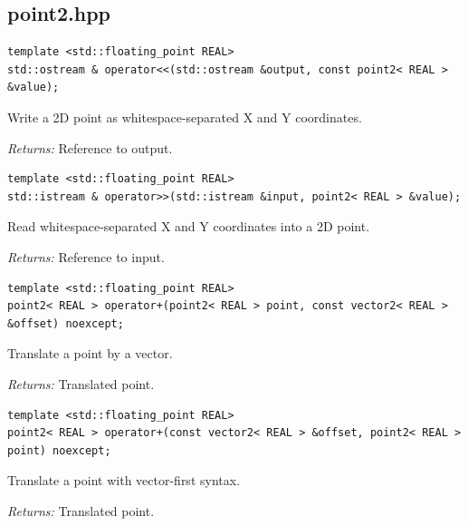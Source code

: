 \subsection{point2.hpp}
\par\noindent\begin{minipage}{\linewidth}
\begin{lstlisting}[style=apireference]
template <std::floating_point REAL>
std::ostream & operator<<(std::ostream &output, const point2< REAL > &value);
\end{lstlisting}
{\footnotesize Write a 2D point as whitespace-separated X and Y coordinates.\par}
{\footnotesize\textit{Returns:} Reference to output.\par}
\end{minipage}\par\vspace{1pt}
\par\noindent\begin{minipage}{\linewidth}
\begin{lstlisting}[style=apireference]
template <std::floating_point REAL>
std::istream & operator>>(std::istream &input, point2< REAL > &value);
\end{lstlisting}
{\footnotesize Read whitespace-separated X and Y coordinates into a 2D point.\par}
{\footnotesize\textit{Returns:} Reference to input.\par}
\end{minipage}\par\vspace{1pt}
\par\noindent\begin{minipage}{\linewidth}
\begin{lstlisting}[style=apireference]
template <std::floating_point REAL>
point2< REAL > operator+(point2< REAL > point, const vector2< REAL > &offset) noexcept;
\end{lstlisting}
{\footnotesize Translate a point by a vector.\par}
{\footnotesize\textit{Returns:} Translated point.\par}
\end{minipage}\par\vspace{1pt}
\par\noindent\begin{minipage}{\linewidth}
\begin{lstlisting}[style=apireference]
template <std::floating_point REAL>
point2< REAL > operator+(const vector2< REAL > &offset, point2< REAL > point) noexcept;
\end{lstlisting}
{\footnotesize Translate a point with vector-first syntax.\par}
{\footnotesize\textit{Returns:} Translated point.\par}
\end{minipage}\par\vspace{1pt}
